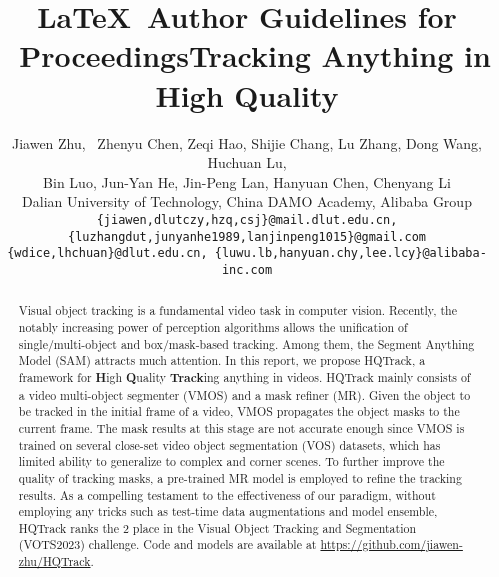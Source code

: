 \documentclass[10pt,twocolumn,letterpaper]{article}
\begin{document}
\title{\LaTeX\ Author Guidelines for \confName~Proceedings}

\title{Tracking Anything in High Quality}

\author{Jiawen Zhu, \ Zhenyu Chen\protect, Zeqi Hao, Shijie Chang, Lu Zhang, Dong Wang, Huchuan Lu, \\
Bin Luo,  Jun-Yan He, Jin-Peng Lan, Hanyuan Chen, Chenyang Li\\
Dalian University of Technology, China \quad
DAMO Academy, Alibaba Group \\
{\tt\small \{jiawen,dlutczy,hzq,csj\}@mail.dlut.edu.cn, \{luzhangdut,junyanhe1989,lanjinpeng1015\}@gmail.com} \\
{\tt\small \{wdice,lhchuan\}@dlut.edu.cn, \{luwu.lb,hanyuan.chy,lee.lcy\}@alibaba-inc.com}
}

\maketitle

\begin{abstract}
	Visual object tracking is a fundamental video task in computer vision.
	Recently, the notably increasing power of perception algorithms allows the unification of single/multi-object and box/mask-based tracking.
	Among them, the Segment Anything Model (SAM) attracts much attention.
	In this report, we propose HQTrack, a framework for \textbf{H}igh \textbf{Q}uality \textbf{Track}ing anything in videos. HQTrack mainly consists of a video multi-object segmenter (VMOS) and a mask refiner (MR).
	Given the object to be tracked in the initial frame of a video, VMOS propagates the object masks to the current frame.
	The mask results at this stage are not accurate enough since VMOS is trained on several close-set video object segmentation (VOS) datasets, which has limited ability to generalize to complex and corner scenes.
	To further improve the quality of tracking masks, a pre-trained MR model is employed to refine the tracking results.
As a compelling testament to the effectiveness of our paradigm, 
	without employing any tricks such as test-time data augmentations and model ensemble,
	HQTrack ranks the 2 place in the Visual Object Tracking and Segmentation (VOTS2023) challenge.
	Code and models are available at \href{https://github.com/jiawen-zhu/HQTrack}{https://github.com/jiawen-zhu/HQTrack}.
 \end{abstract} 
\end{document}
